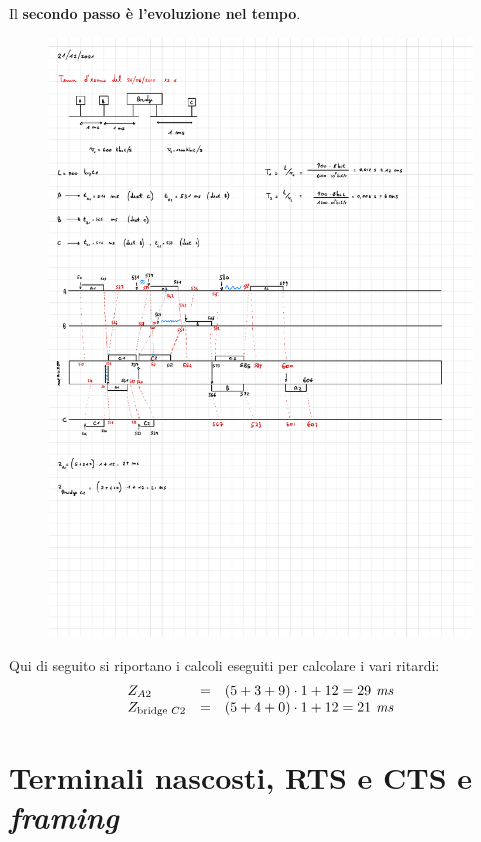 \documentclass[a4paper]{article}
\begin{document}
	\noindent
	Il \textbf{secondo passo è l'evoluzione nel tempo}.
	\begin{figure}[!htp]
		\centering
		\includegraphics[width=\textwidth]{img/ex3_bridge-ALOHA.pdf}
	\end{figure}

	\noindent
	Qui di seguito si riportano i calcoli eseguiti per calcolare i vari ritardi:
	\begin{equation*}
		\begin{array}{lll}
			Z_{A2}					& = & \left(5+3+9\right) \cdot 1 + 12 = 29 \emph{ ms} \\
			Z_{\text{bridge }C2}	& = & \left(5+4+0\right) \cdot 1 + 12 = 21 \emph{ ms}
		\end{array}
	\end{equation*}\newpage

	\section{Terminali nascosti, RTS e CTS e \emph{framing}}
	
\end{document}
